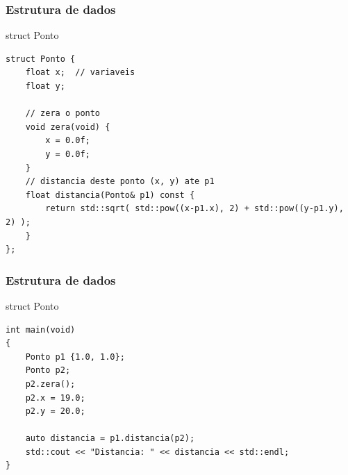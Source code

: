 \documentclass[xcolor={usenames,dvipsnames},10pt,presentation,aspectratio=169]{beamer}
\begin{document}
\begin{frame}[fragile]
  \frametitle{Estrutura de dados}
  \begin{block}{struct Ponto}
\begin{lstlisting}
struct Ponto {
    float x;  // variaveis
    float y;

    // zera o ponto 
    void zera(void) {
        x = 0.0f;
        y = 0.0f;
    }
    // distancia deste ponto (x, y) ate p1
    float distancia(Ponto& p1) const {
        return std::sqrt( std::pow((x-p1.x), 2) + std::pow((y-p1.y), 2) );
    }
};
\end{lstlisting}
  \end{block}
\end{frame}
\begin{frame}[fragile]
  \frametitle{Estrutura de dados}
  \begin{block}{struct Ponto}
\begin{lstlisting}
int main(void)
{
    Ponto p1 {1.0, 1.0};
    Ponto p2;
    p2.zera();
    p2.x = 19.0;
    p2.y = 20.0;

    auto distancia = p1.distancia(p2);
    std::cout << "Distancia: " << distancia << std::endl;
}
\end{lstlisting}
  \end{block}
\end{frame}
\end{document}

